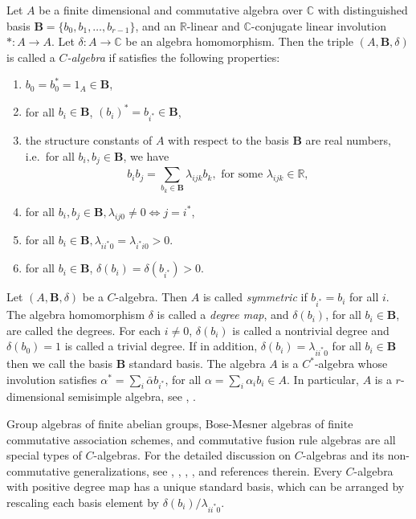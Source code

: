 \documentclass[12pt]{amsart}
\begin{document}
\smallskip

Let $A$ be a finite dimensional and commutative algebra over ${{\mathbb C}}$ with  distinguished basis  $\mathbf{B} = \{b_0, b_1, \hdots, b_{r-1}\}$, and an ${{\mathbb R}}$-linear and ${{\mathbb C}}$-conjugate linear involution $*:A \rightarrow A$. Let $\delta: A \rightarrow {{\mathbb C}}$ be an algebra homomorphism. Then the triple $(A,{{\mathbf B}},\delta)$ is called a \emph{$C$-algebra} if  satisfies the following properties:

\begin{enumerate}
\item $b_0 =b_0^*= 1_A \in \mathbf{B}$,

\item for all $b_i \in \mathbf{B}$, $(b_i)^* = b_{i^*} \in \mathbf{B}$,
\item the structure constants of $A$ with respect to the basis $\mathbf{B}$ are real numbers, i.e.~for all $b_i, b_j \in \mathbf{B}$, we have
$$b_ib_j = \sum_{b_k \in \mathbf{B}}^{}\lambda_{ijk}b_k, \mbox{ for some } \lambda_{ijk} \in \mathbb{R},$$
\item  for all $b_i, b_j \in \mathbf{B}, \lambda_{ij0} \neq 0 \iff j = i^*$,
\item for all $b_i \in \mathbf{B}, \lambda_{ii^*0} = \lambda_{i^*i0} > 0$.
\item for all $b_i\in {{\mathbf B}}$, $\delta(b_i)=\delta(b_{i^*})>0$.
\end{enumerate}

Let $(A,{{\mathbf B}},\delta)$ be a $C$-algebra.  Then $A$ is called \emph{symmetric} if $b_{i^*}=b_i$ for all $i$. The algebra homomorphism $\delta$ is called a \emph{degree map}, and $\delta(b_i)$, for all $b_i\in {{\mathbf B}}$, are  called the degrees. For each $i\neq 0$, $\delta(b_i)$ is called a nontrivial degree and $\delta(b_0)=1$ is called a trivial degree. If in addition, $\delta(b_i)=\lambda_{ii^*0}$ for all $b_i\in {{\mathbf B}}$ then we call the basis ${{\mathbf B}}$ standard basis. The algebra $A$ is a $C^*$-algebra whose involution satisfies $\alpha^* = \sum_i \bar{\alpha}b_{i^*}$, for all $\alpha = \sum_i \alpha_i b_i \in A$.   In particular, $A$ is a $r$-dimensional semisimple algebra, see \cite{HSnew1}, \cite{G1}.

Group algebras of finite abelian groups, Bose-Mesner algebras of finite commutative association schemes, and commutative fusion rule algebras are all special types of $C$-algebras.  For the detailed discussion on $C$-algebras and its non-commutative generalizations, see \cite{AFM}, \cite{Hig87},  \cite{HSnew1}, \cite{G1}, and references therein. Every $C$-algebra with positive degree map has a unique standard basis, which can be arranged by rescaling each basis element by $\delta(b_i)/\lambda_{ii^*0}$.
\end{document}
